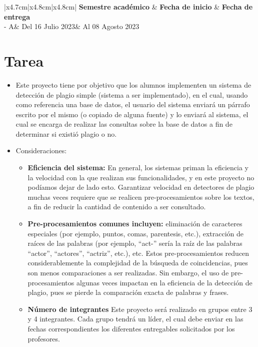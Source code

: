 \documentclass{article}
\newcommand{\itemAcademic}{2023 - A}
\newcommand{\itemInput}{Del 16 Julio 2023}
\newcommand{\itemOutput}{Al 08 Agosto 2023}
\begin{document}
	\begin{table}[H]
		\begin{tabular}{|x{4.7cm}|x{4.8cm}|x{4.8cm}|}
			\hline 
			\color{white}\textbf{Semestre académico} & \color{white}\textbf{Fecha de inicio}  & \color{white}\textbf{Fecha de entrega}   \\
			\hline 
			\itemAcademic & \itemInput &  \itemOutput  \\
			\hline 
		\end{tabular}
	\end{table}
	
	\section{Tarea}
	\begin{itemize}		
		\item Este proyecto tiene por objetivo que los alumnos implementen un sistema de detección de plagio simple (sistema a ser implementado), en el cual, usando como referencia una base de datos, el usuario del sistema enviará un párrafo escrito por el mismo (o copiado de alguna fuente) y lo enviará al sistema, el cual se encarga de realizar las consultas sobre la base de datos a fin de determinar si existió plagio o no.
		\item Consideraciones:
		\begin{itemize}
		\item  \textbf{Eficiencia del sistema:}  En general, los sistemas priman la eficiencia y la velocidad con la que realizan sus funcionalidades, y en este proyecto no podíamos dejar de lado esto.
		Garantizar velocidad en detectores de plagio muchas veces requiere que se realicen pre-procesamientos sobre los textos, a fin de reducir la cantidad de contenido a ser consultado.
		\item \textbf{Pre-procesamientos comunes incluyen:} eliminación de caracteres especiales (por ejemplo, puntos, comas, parentesis, etc.), extracción de raíces de las palabras (por ejemplo, “act-” sería la raíz de las palabras “actor”, “actores”, “actriz”, etc.), etc. Estos pre-procesamientos reducen considerablemente la complejidad de la búsqueda de coincidencias, pues son menos comparaciones a ser realizadas. 
		Sin embargo, el uso de pre-procesamientos algunas veces impactan en la eficiencia de la detección de plagio, pues se pierde la comparación exacta de palabras y
frases.
\item \textbf{Número de integrantes} Este proyecto será realizado en grupos entre 3 y 4 integrantes. Cada grupo tendrá un líder, el cual debe enviar en las fechas
correspondientes los diferentes entregables solicitados por los profesores.
		\end{itemize}
		
	\end{itemize}
		 
\end{document}
